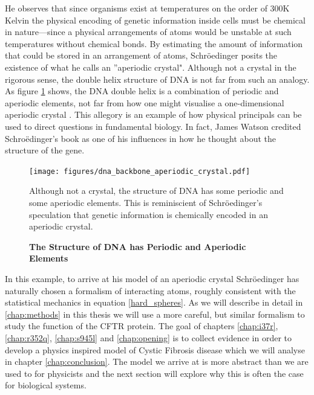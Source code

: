 He observes that since organisms exist at temperatures on the order of 300K Kelvin the physical encoding of genetic information inside cells must be chemical in nature---since a physical arrangements of atoms would be unstable at such temperatures without chemical bonds. By estimating the amount of information that could be stored in an arrangement of atoms, Schr\"oedinger posits the existence of what he calls an ''aperiodic crystal". Although not a crystal in the rigorous sense, the double helix structure of DNA is not far from such an analogy. As figure \ref{dna_structure} shows, the DNA double helix is a combination of periodic and aperiodic elements, not far from how one might visualise a one-dimensional aperiodic crystal \cite{varn2016}. This allegory is an example of how physical principals can be used to direct questions in fundamental biology. In fact, James Watson credited Schro\"edinger's book as one of his influences in how he thought about the structure of the gene.

\begin{figure}
	\begin{center}
		\texttt{[image: figures/dna\_backbone\_aperiodic\_crystal.pdf]}
	\end{center}
	\captionsetup{singlelinecheck = false, justification=raggedright}
	\caption[The Structure of DNA has Periodic and Aperiodic Elements] {\textbf{The Structure of DNA has Periodic and Aperiodic Elements}}{Although not a crystal, the structure of DNA has some periodic and some aperiodic elements. This is reminiscient of Schr\"oedinger's speculation that genetic information is chemically encoded in an aperiodic crystal. }
	\label{dna_structure}
\end{figure}

In this example, to arrive at his model of an aperiodic crystal Schr\"oedinger has naturally chosen a formalism of interacting atoms, roughly consistent with the statistical mechanics in equation \ref{hard_spheres}. As we will describe in detail in \ref{chap:methods} in this thesis we will use a more careful, but similar formalism to study the function of the CFTR protein. The goal of chapters \ref{chap:i37r}, \ref{chap:r352q}, \ref{chap:s945l} and \ref{chap:opening} is to collect evidence in order to develop a physics inspired model of Cystic Fibrosis disease which we will analyse in chapter \ref{chap:conclusion}. The model we arrive at is more abstract than we are used to for physicists and the next section will explore why this is often the case for biological systems.
 
